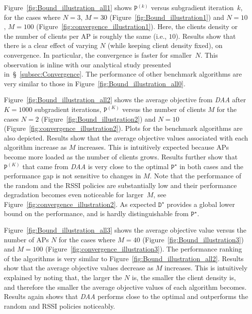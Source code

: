 \documentclass[journal, 10pt, twocolumn]{IEEEtran}
\begin{document}
Figure~\ref{fig:Bound_illustration_all1} shows $\texttt{P}^{(k)}$ versus subgradient iteration~$k$, for the cases where $N=3$, $M=30$ (Figure~\ref{fig:Bound_illustration1}) and $N=10$, $M=100$ (Figure~\ref{fig:convergence_illustration1}). Here, the clients density or the number of clients per AP is roughly the same (i.e., $10$). Results show that there is a clear effect of varying $N$ (while keeping client density fixed), on convergence. In particular, the convergence is faster for smaller~$N$. This observation is inline with our analytical study presented in~\S~\ref{subsec:Convergence}. The performance of other benchmark algorithms are very similar to those in Figure~\ref{fig:Bound_illustration_all0}.





Figure~\ref{fig:Bound_illustration_all2} shows the average objective from \emph{DAA} after $K=1000$ subgradient iterations, $\texttt{P}^{(K)}$ versus the number of clients $M$ for the cases $N=2$ (Figure~\ref{fig:Bound_illustration2}) and $N=10$ (Figure~\ref{fig:convergence_illustration2}). Plots for the benchmark algorithms are also depicted. Results show that the average objective values associated with each algorithm increase as $M$ increases. This is intuitively expected because APs become more loaded as the number of clients grows. Results further show that $\texttt{P}^{(K)}$ that came from \emph{DAA} is very close to the optimal $\texttt{P}^\star$ in both cases and the performance gap is not sensitive to changes in $M$. Note that the performance of the random and the RSSI policies are substantially low and their performance degradation becomes even noticeable for larger~$M$, see Figure~\ref{fig:convergence_illustration2}. As expected $\texttt{D}^\star$ provides a global lower bound on the performance, and is hardly distinguishable from $\texttt{P}^\star$.

Figure~\ref{fig:Bound_illustration_all3} shows the average objective value versus the number of APs $N$ for the cases where $M=40$ (Figure~\ref{fig:Bound_illustration3}) and $M=100$ (Figure~\ref{fig:convergence_illustration3}). The performance ranking of the algorithms is very similar to Figure~\ref{fig:Bound_illustration_all2}. Results show that the average objective values decrease as $M$ increases. This is intuitively explained by noting that, the larger the $N$ is, the smaller the client density is, and therefore the smaller the average objective values of each algorithm becomes. Results again shows that \emph{DAA} performs close to the optimal and outperforms the random and RSSI policies noticeably.
\end{document}
